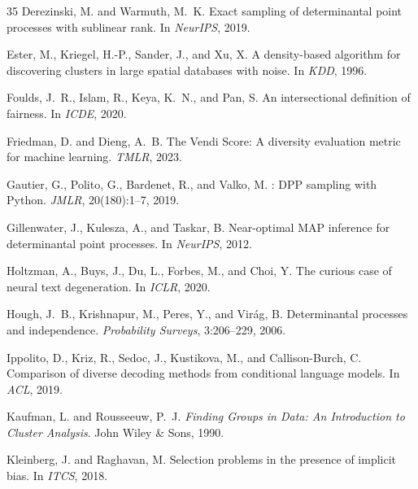 \documentclass[11pt]{article}
\begin{document}
\begin{thebibliography}{35}
Derezinski, M. and Warmuth, M.~K.
\newblock Exact sampling of determinantal point processes with sublinear rank.
\newblock In \emph{NeurIPS}, 2019.

Ester, M., Kriegel, H.-P., Sander, J., and Xu, X.
\newblock A density-based algorithm for discovering clusters in large spatial
  databases with noise.
\newblock In \emph{KDD}, 1996.

Foulds, J.~R., Islam, R., Keya, K.~N., and Pan, S.
\newblock An intersectional definition of fairness.
\newblock In \emph{ICDE}, 2020.

Friedman, D. and Dieng, A.~B.
\newblock The {V}endi {S}core: A diversity evaluation metric for machine
  learning.
\newblock \emph{TMLR}, 2023.

Gautier, G., Polito, G., Bardenet, R., and Valko, M.
: {DPP} sampling with {P}ython.
\newblock \emph{JMLR}, 20(180):1--7, 2019.

Gillenwater, J., Kulesza, A., and Taskar, B.
\newblock Near-optimal {MAP} inference for determinantal point processes.
\newblock In \emph{NeurIPS}, 2012.

Holtzman, A., Buys, J., Du, L., Forbes, M., and Choi, Y.
\newblock The curious case of neural text degeneration.
\newblock In \emph{ICLR}, 2020.

Hough, J.~B., Krishnapur, M., Peres, Y., and Vir{\'a}g, B.
\newblock Determinantal processes and independence.
\newblock \emph{Probability Surveys}, 3:206--229, 2006.

Ippolito, D., Kriz, R., Sedoc, J., Kustikova, M., and Callison-Burch, C.
\newblock Comparison of diverse decoding methods from conditional language
  models.
\newblock In \emph{ACL}, 2019.

Kaufman, L. and Rousseeuw, P.~J.
\newblock \emph{Finding Groups in Data: An Introduction to Cluster Analysis}.
\newblock John Wiley \& Sons, 1990.

Kleinberg, J. and Raghavan, M.
\newblock Selection problems in the presence of implicit bias.
\newblock In \emph{ITCS}, 2018.


\end{thebibliography}
\end{document}
